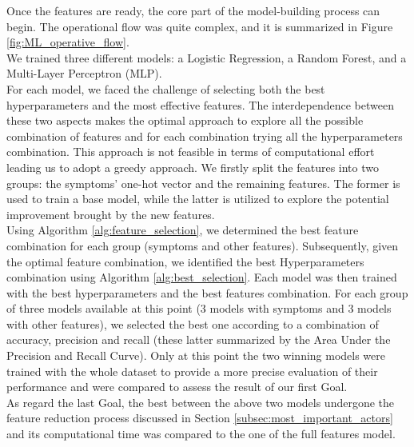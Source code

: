 Once the features are ready, the core part of the model-building process can begin. The operational flow was quite complex,
and it is summarized in Figure \ref{fig:ML_operative_flow}.\\
We trained three different models: a Logistic Regression, a Random Forest, and a Multi-Layer Perceptron (MLP).\\
For each model, we faced the challenge of selecting both the best hyperparameters and the most effective features.
The interdependence between these two aspects makes the optimal approach to explore all the possible combination of features
and for each combination trying all the hyperparameters combination. This approach is not feasible in terms of computational effort
leading us to adopt a greedy approach. We firstly split the features into two
groups: the symptoms' one-hot vector and the remaining features. The former is used to train a base model,
while the latter is utilized to explore the potential improvement brought by the new features.\\
Using Algorithm \ref{alg:feature_selection}, we determined the best feature combination for each group (symptoms and other features).
Subsequently, given the optimal feature combination, we identified the best Hyperparameters combination using Algorithm
\ref{alg:best_selection}. Each model was then trained with the best hyperparameters and the best features combination.
For each group of three models available at this point (3 models with symptoms and 3 models with other features), we selected the best one
according to a combination of accuracy, precision and recall (these latter summarized by the Area Under the Precision and Recall Curve).
Only at this point the two winning models were trained with the whole dataset to provide a more precise evaluation of their performance and
were compared to assess the result of our first Goal.\\
As regard the last Goal, the best between the above two models undergone the feature reduction process
discussed in Section \ref{subsec:most_important_actors} and its computational time was compared to the one of the full features model.\\

